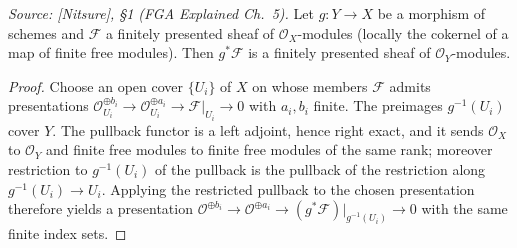 \begin{lemma}\leanok
  \label{lem:pullback_finite_presentation}
  \textit{Source: [Nitsure], \S 1 (FGA Explained Ch.~5).}
  Let \(g : Y \to X\) be a morphism of schemes and \(\mathcal{F}\) a finitely
  presented sheaf of \(\mathcal{O}_X\)-modules (locally the cokernel of a map
  of finite free modules).  Then \(g^* \mathcal{F}\) is a finitely presented
  sheaf of \(\mathcal{O}_Y\)-modules.
\end{lemma}
\begin{proof}\leanok
  Choose an open cover \(\{U_i\}\) of \(X\) on whose members \(\mathcal{F}\)
  admits presentations
  \(\mathcal{O}_{U_i}^{\oplus b_i} \to \mathcal{O}_{U_i}^{\oplus a_i} \to
  \mathcal{F}|_{U_i} \to 0\) with \(a_i, b_i\) finite.  The preimages
  \(g^{-1}(U_i)\) cover \(Y\).  The pullback functor is a left adjoint, hence
  right exact, and it sends \(\mathcal{O}_X\) to \(\mathcal{O}_Y\) and finite
  free modules to finite free modules of the same rank; moreover restriction
  to \(g^{-1}(U_i)\) of the pullback is the pullback of the restriction along
  \(g^{-1}(U_i) \to U_i\).  Applying the restricted pullback to the chosen
  presentation therefore yields a presentation
  \(\mathcal{O}^{\oplus b_i} \to \mathcal{O}^{\oplus a_i} \to
  (g^*\mathcal{F})|_{g^{-1}(U_i)} \to 0\) with the same finite index sets.
\end{proof}

